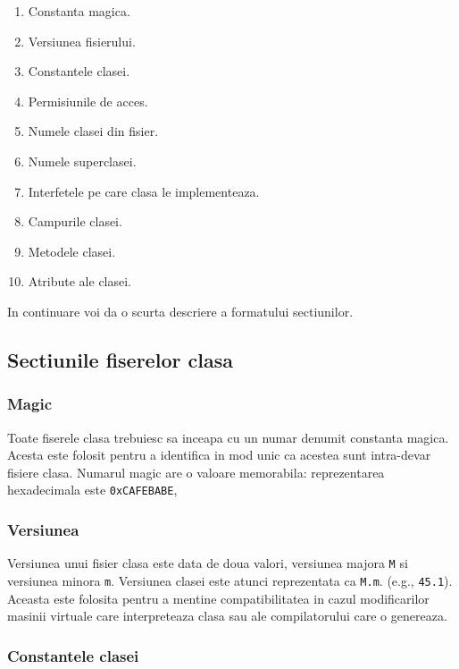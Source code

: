\documentclass[]{article}
\providecommand{\tightlist}{%
  \setlength{\itemsep}{0pt}\setlength{\parskip}{0pt}}
\begin{document}
\begin{enumerate}
\def\labelenumi{\arabic{enumi}.}
\tightlist
\item
  Constanta magica.
\item
  Versiunea fisierului.
\item
  Constantele clasei.
\item
  Permisiunile de acces.
\item
  Numele clasei din fisier.
\item
  Numele superclasei.
\item
  Interfetele pe care clasa le implementeaza.
\item
  Campurile clasei.
\item
  Metodele clasei.
\item
  Atribute ale clasei.
\end{enumerate}

In continuare voi da o scurta descriere a formatului sectiunilor.

\subsection{Sectiunile fiserelor
clasa}\label{sectiunile-fiserelor-clasa}

\subsubsection{Magic}\label{magic}

Toate fiserele clasa trebuiesc sa inceapa cu un numar denumit constanta
magica. Acesta este folosit pentru a identifica in mod unic ca acestea
sunt intra-devar fisiere clasa. Numarul magic are o valoare memorabila:
reprezentarea hexadecimala este \texttt{0xCAFEBABE},

\subsubsection{Versiunea}\label{versiunea}

Versiunea unui fisier clasa este data de doua valori, versiunea majora
\texttt{M} si versiunea minora \texttt{m}. Versiunea clasei este atunci
reprezentata ca \texttt{M.m}. (e.g., \texttt{45.1}). Aceasta este
folosita pentru a mentine compatibilitatea in cazul modificarilor
masinii virtuale care interpreteaza clasa sau ale compilatorului care o
genereaza.

\subsubsection{Constantele clasei}\label{constantele-clasei}
\end{document}
